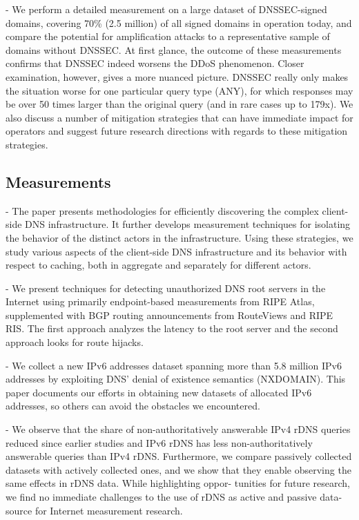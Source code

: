\cite{van2014dnssec} - We perform a detailed measurement on a large dataset of DNSSEC-signed domains, covering 70\% (2.5 million) of all signed domains in operation today, and compare the potential for amplification attacks to a representative sample of domains without DNSSEC. At first glance, the outcome of these measurements confirms that DNSSEC indeed worsens the DDoS phenomenon. Closer examination, however, gives a more nuanced picture. DNSSEC really only makes the situation worse for one particular query type (ANY), for which responses may be over 50 times larger than the original query (and in rare cases up to 179x). We also discuss a number of mitigation strategies that can have immediate impact for operators and suggest future research directions with regards to these mitigation strategies.

\subsection{Measurements}
\cite{schomp2013measuring} - The paper presents methodologies for efficiently discovering the complex client-side DNS infrastructure. It further develops measurement techniques for isolating the behavior of the distinct actors in the infrastructure. Using these strategies, we study various aspects of the client-side DNS infrastructure and its behavior with respect to caching, both in aggregate and separately for different actors.


\cite{jones2016detecting} - We present techniques for detecting unauthorized DNS root servers in the Internet using primarily endpoint-based measurements from RIPE Atlas, supplemented with BGP routing announcements from RouteViews and RIPE RIS. The first approach analyzes the latency to the root server and the second approach looks for route hijacks.

\cite{fiebig2017something} - We collect a new IPv6 addresses dataset spanning more than 5.8 million IPv6 addresses by exploiting DNS’ denial of existence semantics (NXDOMAIN). This paper documents our efforts in obtaining new datasets of allocated IPv6 addresses, so others can avoid the obstacles we encountered.

\cite{fiebig2018rdns} - We observe that the share of non-authoritatively answerable IPv4 rDNS queries reduced since earlier studies and IPv6 rDNS has less non-authoritatively answerable queries than IPv4 rDNS. Furthermore, we compare passively collected datasets with actively collected ones, and we show that they enable observing the same effects in rDNS data. While highlighting oppor- tunities for future research, we find no immediate challenges to the use of rDNS as active and passive data-source for Internet measurement research.

